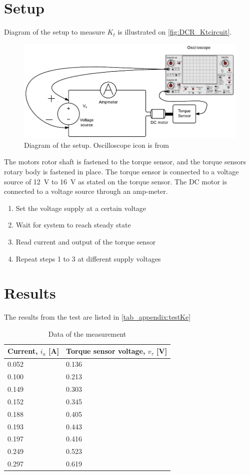 \section*{Setup}
Diagram of the setup to measure $K_t$ is illustrated on \autoref{fig:DCR_Ktcircuit}. 
\begin{figure} [!h]
    \centering
        \includegraphics[width=\textwidth]{figures/test/DCR_Ktcircuit}
        \caption{Diagram of the setup. Oscilloscope icon is from \cite{web:OscilloscopeIcon}}
        \label{fig:DCR_Ktcircuit}
\end{figure}

The motors rotor shaft is fastened to the torque sensor, and the torque sensors rotary body is fastened in place. The torque sensor is connected to a voltage source of \SI{12}{\volt} to \SI{16}{\volt} as stated on the torque sensor. The DC motor is connected to a voltage source through an amp-meter. 
\begin{enumerate}
\item Set the voltage supply at a certain voltage
\item Wait for system to reach steady state
\item Read current and output of the torque sensor
\item Repeat steps 1 to 3 at different supply voltages
\end{enumerate}

\section*{Results}
The results from the test are listed in \autoref{tab_appendix:testKe}
\begin{table} [!h]
	\centering
	\caption{Data of the measurement}\label{tab_appendix:testKe}
	\begin{tabularx}{\textwidth}{XX}
		Current, $i_a$ [\si{\ampere}]& Torque sensor voltage, $v_\tau$ [\si{\volt}]								\\ \toprule \rowcolor{lightGrey}
		0.052 & 0.136 \\
		0.100	& 0.213 \\ \rowcolor{lightGrey}
		0.149 & 0.303 \\
		0.152 & 0.345\\\rowcolor{lightGrey}
		0.188 & 0.405\\
		0.193 & 0.443\\\rowcolor{lightGrey}
		0.197 & 0.416 \\
		0.249 & 0.523 \\ \rowcolor{lightGrey}
		0.297 & 0.619 
	\end{tabularx}
\end{table}


